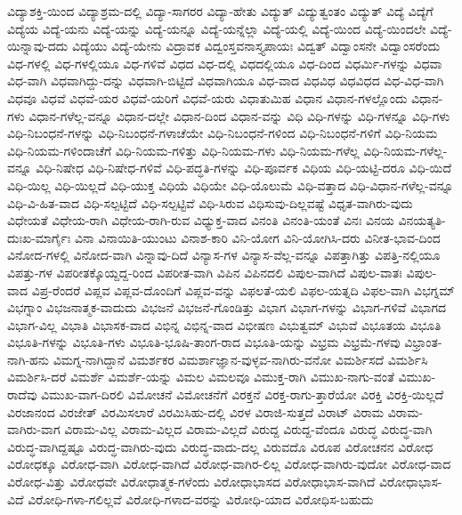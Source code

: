 {ವಿದ್ಯಾಶಕ್ತಿ-ಯಿಂದ
ವಿದ್ಯಾಶ್ರಮ-ದಲ್ಲಿ
ವಿದ್ಯಾ-ಸಾಗರರ
ವಿದ್ಯಾ-ಹೇತು
ವಿದ್ಯುತ್
ವಿದ್ಯುತ್ವಂತಂ
ವಿದ್ಯುತ್
ವಿದ್ಯೆ
ವಿದ್ಯೆಗೆ
ವಿದ್ಯೆಯ
ವಿದ್ಯೆ-ಯನು
ವಿದ್ಯೆ-ಯನ್ನು
ವಿದ್ಯೆ-ಯನ್ನೂ
ವಿದ್ಯೆ-ಯನ್ನೆಲ್ಲಾ
ವಿದ್ಯೆ-ಯಲ್ಲಿ
ವಿದ್ಯೆ-ಯಿಂದ
ವಿದ್ಯೆ-ಯಿಂದಲೇ
ವಿದ್ಯೆ-ಯಿನ್ನಾವು-ದದು
ವಿದ್ಯೆಯು
ವಿದ್ಯೆ-ಯೇನು
ವಿದ್ರಾವಕ
ವಿದ್ವಂಸ್ತವನಾಸ್ತ್ಯಪಾಯಃ
ವಿದ್ವತ್
ವಿದ್ವಾಂಸನೇ
ವಿದ್ವಾಂಸರೆಂದು
ವಿಧ-ಗಳಲ್ಲಿ
ವಿಧ-ಗಳಲ್ಲಿಯೂ
ವಿಧ-ಗಳಿವೆ
ವಿಧದ
ವಿಧ-ದಲ್ಲಿ
ವಿಧದಲ್ಲಿಯೂ
ವಿಧ-ದಿಂದ
ವಿಧರ್ಮಿ-ಗಳನ್ನು
ವಿಧವಾ
ವಿಧ-ವಾಗಿ
ವಿಧವಾಗಿದ್ದು-ದನ್ನು
ವಿಧವಾಗಿ-ಬಿಟ್ಟಿದೆ
ವಿಧವಾಗಿಯೂ
ವಿಧ-ವಾದ
ವಿಧವಿಧ
ವಿಧವಿಧದ
ವಿಧ-ವಿಧ-ವಾಗಿ
ವಿಧವೂ
ವಿಧವೆ
ವಿಧವೆ-ಯರ
ವಿಧವೆ-ಯರಿಗೆ
ವಿಧವೆ-ಯರು
ವಿಧಾತುಮಿಹ
ವಿಧಾನ
ವಿಧಾನ-ಗಳಲ್ಲೊಂದು
ವಿಧಾನ-ಗಳು
ವಿಧಾನ-ಗಳೆಲ್ಲ-ವನ್ನೂ
ವಿಧಾನ-ದಲ್ಲೇ
ವಿಧಾನ-ದಿಂದ
ವಿಧಾನ-ವನ್ನು
ವಿಧಿ
ವಿಧಿ-ಗಳನ್ನು
ವಿಧಿ-ಗಳನ್ನೂ
ವಿಧಿ-ಗಳು
ವಿಧಿ-ನಿಬಂಧನೆ-ಗಳನ್ನು
ವಿಧಿ-ನಿಬಂಧನೆ-ಗಳಾಚೆಯೇ
ವಿಧಿ-ನಿಬಂಧನೆ-ಗಳಿಂದ
ವಿಧಿ-ನಿಬಂಧನೆ-ಗಳಿಗೆ
ವಿಧಿ-ನಿಯಮ
ವಿಧಿ-ನಿಯಮ-ಗಳಿಂದಾಚೆಗೆ
ವಿಧಿ-ನಿಯಮ-ಗಳಿತ್ತು
ವಿಧಿ-ನಿಯಮ-ಗಳು
ವಿಧಿ-ನಿಯಮ-ಗಳೆಲ್ಲ
ವಿಧಿ-ನಿಯಮ-ಗಳೆಲ್ಲ-ವನ್ನೂ
ವಿಧಿ-ನಿಷೇಧ
ವಿಧಿ-ನಿಷೇಧ-ಗಳಿವೆ
ವಿಧಿ-ಪದ್ಧತಿ-ಗಳನ್ನು
ವಿಧಿ-ಪೂರ್ವಕ
ವಿಧಿಯ
ವಿಧಿ-ಯಟ್ಟಿ-ದರೂ
ವಿಧಿ-ಯಿದೆ
ವಿಧಿ-ಯಿಲ್ಲ
ವಿಧಿ-ಯಿಲ್ಲದೆ
ವಿಧಿ-ಯುಕ್ತ
ವಿಧಿಯೆ
ವಿಧಿಯೇ
ವಿಧಿ-ಯೊಲುಮೆ
ವಿಧಿ-ವತ್ತಾದ
ವಿಧಿ-ವಿಧಾನ-ಗಳೆಲ್ಲ-ವನ್ನೂ
ವಿಧಿ-ವಿ-ಹಿತ-ವಾದ
ವಿಧಿ-ಸಲ್ಪಟ್ಟಿದೆ
ವಿಧಿ-ಸಲ್ಪಟ್ಟಿವೆ
ವಿಧಿ-ಸಿರುವ
ವಿಧಿಸುವು-ದಿಲ್ಲವಷ್ಟೆ
ವಿಧೃತ-ವಾಗಿರು-ವುದು
ವಿಧೇಯತೆ
ವಿಧೇಯ-ರಾಗಿ
ವಿಧೇಯ-ರಾಗಿ-ರುವ
ವಿಧ್ಯುಕ್ತ-ವಾದ
ವಿನಂತಿ
ವಿನಂತಿ-ಯಂತೆ
ವಿನಃ
ವಿನಯ
ವಿನಯತ್ಯತಿ-ದುಃಖ-ಮಾರ್ಗೈಃ
ವಿನಾ
ವಿನಾಯಿತಿ-ಯುಂಟು
ವಿನಾಶ-ಕಾರಿ
ವಿನಿ-ಯೋಗ
ವಿನಿ-ಯೋಗಿಸಿ-ದರು
ವಿನೀತ-ಭಾವ-ದಿಂದ
ವಿನೋದ-ಗಳಲ್ಲಿ
ವಿನೋದ-ವಾಗಿ
ವಿನ್ನಾವು-ದಿದೆ
ವಿನ್ಯಾಸ-ಗಳ
ವಿನ್ಯಾಸ-ವೆಲ್ಲ-ವನ್ನೂ
ವಿಪತ್ತಾಗಿತ್ತು
ವಿಪತ್ತಿ-ನಲ್ಲಿಯೂ
ವಿಪತ್ತು-ಗಳ
ವಿಪರೀತಕ್ಕೊಯ್ದದ್ದ-ರಿಂದ
ವಿಪರೀತ-ವಾಗಿ
ವಿಪಿನ
ವಿಪಿನದಲಿ
ವಿಪುಲ-ವಾಗಿದೆ
ವಿಪುಲ-ವಾತಃ
ವಿಪುಲ-ವಾದ
ವಿಪ್ರ-ರೆಂದರೆ
ವಿಪ್ಲವ
ವಿಪ್ಲವ-ದೊಂದಿಗೆ
ವಿಪ್ಲವ-ವನ್ನು
ವಿಫಲತೆ-ಯಲಿ
ವಿಫಲ-ಯತ್ನದಿ
ವಿಫಲ-ವಾಗಿ
ವಿಭಗ್ನಮ್
ವಿಭಗ್ನಾಂ
ವಿಭಜನಾತ್ಮಕ-ವಾದುದು
ವಿಭಜನೆ
ವಿಭಜನೆ-ಗೊಂಡಿತ್ತು
ವಿಭಾಗ
ವಿಭಾಗ-ಗಳನ್ನು
ವಿಭಾಗ-ಗಳಿವೆ
ವಿಭಾಗದ
ವಿಭಾಗ-ವಿಲ್ಲ
ವಿಭಾತಿ
ವಿಭಾಸಕ-ವಾದ
ವಿಭಿನ್ನ
ವಿಭಿನ್ನ-ವಾದ
ವಿಭೀಷಣ
ವಿಭುತ್ವಮ್
ವಿಭುವೆ
ವಿಭೂತಯ
ವಿಭೂತಿ
ವಿಭೂತಿ-ಗಳನ್ನು
ವಿಭೂತಿ-ಗಳು
ವಿಭೂತಿ-ಭೂಷಿ-ತಾಂಗ-ರಾದ
ವಿಭೂತಿ-ಯನ್ನು
ವಿಭ್ರಮ
ವಿಭ್ರಮೆ-ಗಳವು
ವಿಭ್ರಾಂತ-ನಾಗಿ-ಹನು
ವಿಮಗ್ನ-ನಾಗಿದ್ದಾನೆ
ವಿಮರ್ಶಕರ
ವಿಮರ್ಶಾಜ್ಞಾನ-ವುಳ್ಳವ-ನಾಗಿರು-ವನೋ
ವಿಮರ್ಶಿಸದೆ
ವಿಮರ್ಶಿಸಿ
ವಿಮರ್ಶಿಸಿ-ದರೆ
ವಿಮರ್ಶೆ
ವಿಮರ್ಶೆ-ಯನ್ನು
ವಿಮಲ
ವಿಮಲವೂ
ವಿಮುಕ್ತ-ರಾಗಿ
ವಿಮುಖ-ನಾಗು-ವಂತೆ
ವಿಮುಖ-ರಾದೆವು
ವಿಮುಖ-ವಾಗ-ದಿರಲಿ
ವಿಮೋಚನೆ
ವಿಮೋಚನೆಗೆ
ವಿರಕ್ತನೆ
ವಿರಕ್ತ-ರಾಗು-ತ್ತಾರೆಯೋ
ವಿರಕ್ತಿ
ವಿರಕ್ತಿ-ಯಿಲ್ಲದೆ
ವಿರಜಾನಂದ
ವಿರಜೇತ್
ವಿರಮಿಸಲಾರೆ
ವಿರಮಿಸಿಹು-ದಲ್ಲಿ
ವಿರಳ
ವಿರಾಜಿ-ಸುತ್ತದೆ
ವಿರಾಟ್
ವಿರಾಮ
ವಿರಾಮ-ವಾಗಿರು-ವಾಗ
ವಿರಾಮ-ವಿಲ್ಲ
ವಿರಾಮ-ವಿಲ್ಲದ
ವಿರಾಮ-ವಿಲ್ಲದೆ
ವಿರುದ್ದ
ವಿರುದ್ದ-ವೆಂದೂ
ವಿರುದ್ಧ
ವಿರುದ್ಧ-ವಾಗಿ
ವಿರುದ್ಧ-ವಾಗಿದ್ದಷ್ಟೂ
ವಿರುದ್ಧ-ವಾಗಿರು-ವುದು
ವಿರುದ್ಧ-ವಾದು-ದಲ್ಲ
ವಿರುವದೊ
ವಿರೂಪ
ವಿರೋಚನನ
ವಿರೋಧ
ವಿರೋಧಕ್ಕೂ
ವಿರೋಧ-ವಾಗಿ
ವಿರೋಧ-ವಾಗಿದೆ
ವಿರೋಧ-ವಾಗಿರ-ಲಿಲ್ಲ
ವಿರೋಧ-ವಾಗಿರು-ವುದೋ
ವಿರೋಧ-ವಾದ
ವಿರೋಧ-ವಿತ್ತು
ವಿರೋಧವೇ
ವಿರೋಧಾತ್ಮಕ-ಗಳೆಂದು
ವಿರೋಧಾಭಾಸದ
ವಿರೋಧಾಭಾಸ-ವಾಗಿದೆ
ವಿರೋಧಾಭಾಸ-ವಿದೆ
ವಿರೋಧಿ-ಗಳಾ-ಗಲಿಲ್ಲವೆ
ವಿರೋಧಿ-ಗಳಾದ-ವರನ್ನು
ವಿರೋಧಿ-ಯಾದ
ವಿರೋಧಿಸ-ಬಹುದು
}
